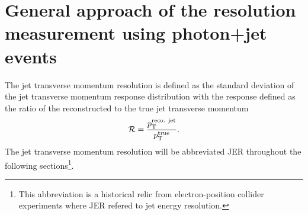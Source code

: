 \chapter{General approach of the resolution measurement using photon+jet events}
\label{ch:GeneralApproach}

The jet transverse momentum resolution is defined as the standard deviation of the jet transverse momentum response distribution with the response 
defined as the ratio of the reconstructed to the true jet transverse momentum 
\begin{equation}\label{eq:responseFormula}
\mathcal{R} =  \frac{p_{\text{T}}^{\text{reco. jet}}}{p_{\text{T}}^{\text{true}}}.
\end{equation}
The jet transverse momentum resolution will be abbreviated JER throughout the following sections\footnote{This abbreviation is a historical relic from electron-position collider experiments where JER refered to jet energy resolution.}.

